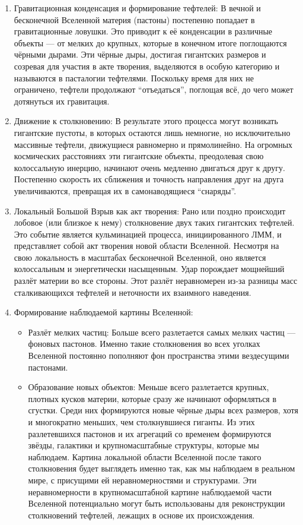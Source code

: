 \documentclass[pdflatex,sn-mathphys-num,referee]{sn-jnl}
\begin{document}
\begin{enumerate}
    \item Гравитационная конденсация и формирование тефтелей: В вечной и бесконечной Вселенной материя (пастоны) постепенно попадает в гравитационные ловушки. Это приводит к её конденсации в различные объекты --- от мелких до крупных, которые в конечном итоге поглощаются чёрными дырами. Эти чёрные дыры, достигая гигантских размеров и созревая для участия в акте творения, выделяются в особую категорию и называются в пасталогии тефтелями. Поскольку время для них не ограничено, тефтели продолжают ``отъедаться'', поглощая всё, до чего может дотянуться их гравитация.
    \item Движение к столкновению: В результате этого процесса могут возникать гигантские пустоты, в которых остаются лишь немногие, но исключительно массивные тефтели, движущиеся равномерно и прямолинейно. На огромных космических расстояниях эти гигантские объекты, преодолевая свою колоссальную инерцию, начинают очень медленно двигаться друг к другу. Постепенно скорость их сближения и точность направления друг на друга увеличиваются, превращая их в самонаводящиеся ``снаряды''.
    \item Локальный Большой Взрыв как акт творения: Рано или поздно происходит лобовое (или близкое к нему) столкновение двух таких гигантских тефтелей. Это событие является кульминацией процесса, инициированного ЛММ, и представляет собой акт творения новой области Вселенной. Несмотря на свою локальность в масштабах бесконечной Вселенной, оно является колоссальным и энергетически насыщенным. Удар порождает мощнейший разлёт материи во все стороны. Этот разлёт неравномерен из-за разницы масс сталкивающихся тефтелей и неточности их взаимного наведения.
    \item Формирование наблюдаемой картины Вселенной:
    \begin{itemize}
        \item Разлёт мелких частиц: Больше всего разлетается самых мелких частиц --- фоновых пастонов. Именно такие столкновения во всех уголках Вселенной постоянно пополняют фон пространства этими вездесущими пастонами.
        \item Образование новых объектов: Меньше всего разлетается крупных, плотных кусков материи, которые сразу же начинают оформляться в сгустки. Среди них формируются новые чёрные дыры всех размеров, хотя и многократно меньших, чем столкнувшиеся гиганты. Из этих разлетевшихся пастонов и их агрегаций со временем формируются звёзды, галактики и крупномасштабные структуры, которые мы наблюдаем. Картина локальной области Вселенной после такого столкновения будет выглядеть именно так, как мы наблюдаем в реальном мире, с присущими ей неравномерностями и структурами. Эти неравномерности в крупномасштабной картине наблюдаемой части Вселенной потенциально могут быть использованы для реконструкции столкновений тефтелей, лежащих в основе их происхождения.
    \end{itemize}
\end{enumerate}
\end{document}
